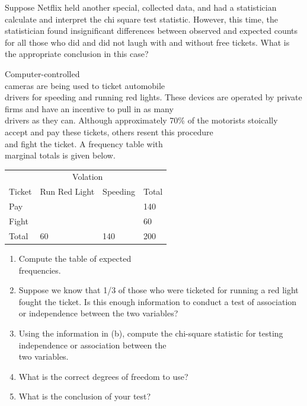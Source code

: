 \documentclass[11pt, chapterprefix=true]{scrbook}\usepackage[]{graphicx}\usepackage[]{color}
\begin{document}
\begin{exercises}
\begin{solution}
\end{solution}

\begin{exercise} %

Suppose Netflix held another special, collected data, and had a statistician calculate and interpret the chi square test statistic. However, this time, the statistician found insignificant differences between observed and expected counts for all those who did and did not laugh with and without free tickets. What is the appropriate conclusion in this case?
\end{exercise}
\begin{solution} %

\end{solution}

\begin{exercise} %

Computer-controlled \\ cameras are being used to ticket automobile \\ drivers for speeding and running red lights.  These devices are operated by private firms and have an incentive to pull in as many \\ drivers as they can.  Although approximately 70\% of the motorists stoically accept and pay these tickets, others resent this procedure \\ and fight the ticket.  A frequency table with \\ marginal totals is given below. 

\begin{table}[ht]
\centering
\begin{tabular}{@{} llll @{}} \hline
& \multicolumn{2}{c}{Volation} \\
Ticket & Run Red Light & Speeding & Total \\ \hline
Pay  &  &   & 140 \\
Fight   &  &  & 60  \\ \hline
Total & 60 & 140 & 200 \\ \hline
\end{tabular}
\end{table}

\begin{enumerate}
  \item Compute the table of expected \\ frequencies.
  \item Suppose we know that 1/3 of those who were ticketed for running a red light \\ fought the ticket.  Is this enough information to conduct a test of association or independence between the two variables?
  \item Using the information in (b), compute the chi-square statistic for testing independence or association between the \\ two variables.
  \item What is the correct degrees of freedom to use?
  \item What is the conclusion of your test?
\end{enumerate}


\end{exercise}
\end{exercises}
\end{document}
